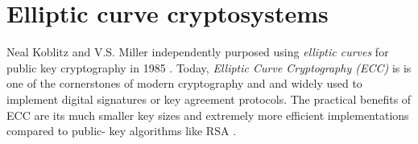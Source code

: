 \section{Elliptic curve cryptosystems}

Neal Koblitz and V.S. Miller independently purposed using \emph{elliptic curves} for
public key cryptography in 1985 \cite{bruce, bruce867, bruce1095}. Today, \emph{Elliptic Curve Cryptography (ECC)}
is is one of the cornerstones of modern
cryptography and
and widely used to implement
digital signatures or key agreement protocols. The practical benefits of ECC are its much smaller
key sizes and extremely more efficient  implementations compared to public-
key algorithms like RSA \cite{rsa, eddsa, rsavsecc}.